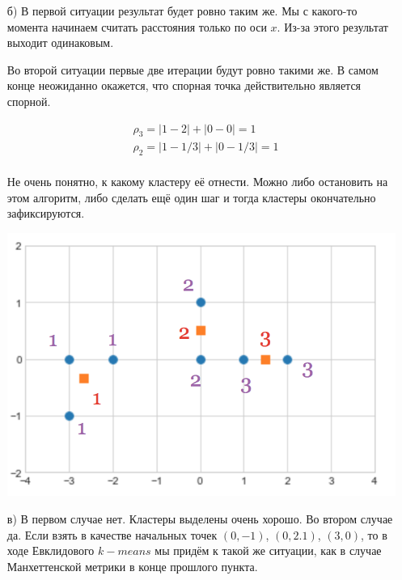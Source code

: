 \documentclass[12pt, a4paper, oneside]{article}
\begin{document}
{\begin{enumerate}
Оказывается, что она ближе ко второму ларьку. На этом, после двух итераций алгоритм прекращает работу. 

	\item[б)]  В первой ситуации результат будет ровно таким же. Мы с какого-то момента начинаем считать расстояния только по оси $x$. Из-за этого результат выходит одинаковым. 

	Во второй ситуации первые две итерации будут ровно такими же. В самом конце неожиданно окажется, что спорная точка действительно является спорной. 
	
	\begin{equation}
	\begin{aligned}
	& \rho_3 = |1 - 2| + | 0 - 0| = 1\\ 
	& \rho_2 = |1 - 1/3|  + | 0 - 1/3| = 1 \\ 
	\end{aligned}
	\end{equation}
	
Не очень понятно, к какому кластеру её отнести. Можно либо остановить на этом алгоритм, либо сделать ещё один шаг и тогда кластеры окончательно зафиксируются. 
	
\begin{center}
	\includegraphics[scale=0.25]{k_means_b5.png}
\end{center}
	
	 
	\item[в)]  В первом случае нет. Кластеры выделены очень хорошо. Во втором случае да. Если взять в качестве начальных точек $(0,-1)$, $(0,2.1)$, $(3,0)$, то в ходе Евклидового $k-means$ мы придём к такой же ситуации, как в случае Манхеттенской метрики в конце прошлого пункта.
\end{enumerate}
}
\end{document}
